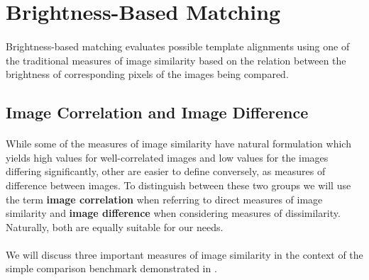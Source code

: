 \section{Brightness-Based Matching}

\paragraph*{}
Brightness-based matching evaluates possible template alignments using one of the traditional measures of image similarity based on the relation between the brightness of corresponding pixels of the images being compared.

\subsection{Image Correlation and Image Difference}

\paragraph*{}
While some of the measures of image similarity have natural formulation which yields high values for well-correlated images and low values for the images differing significantly, other are easier to define conversely, as measures of difference between images. To distinguish between these two groups we will use the term \textbf{image correlation} when referring to direct measures of image similarity and \textbf{image difference} when considering measures of dissimilarity. Naturally, both are equally suitable for our needs.

\paragraph*{}
We will discuss three important measures of image similarity in the context of the simple comparison benchmark demonstrated in .

